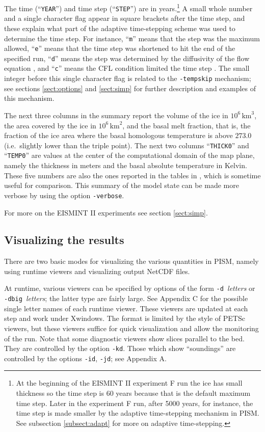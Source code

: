 \documentclass[11pt,final]{amsart}
\renewcommand{\t}[1]{\texttt{#1}}
\begin{document}
The time (``\t{YEAR}'') and time step (``\t{STEP}'') are in years.\footnote{At the beginning of the EISMINT II experiment F run the ice has small thickness so the time step is 60 years because that is the default maximum time step.  Later in the experiment F run, after 5000 years, for instance, the time step is made smaller by the adaptive time-stepping mechanism in PISM.  See subsection \ref{subsect:adapt} for more on adaptive time-stepping.}  A small whole number and a single character flag appear in square brackets after the time step, and these explain what part of the adaptive time-stepping scheme was used to determine the time step.  For instance, ``\t{m}'' means that the step was the maximum allowed, ``\t{e}'' means that the time step was shortened to hit the end of the specified run, ``\t{d}'' means the step was determined by the diffusivity of the flow equation \cite{BBL}, and ``\t{c}'' means the CFL condition limited the time step \cite{BBL,MortonMayers}.  The small integer before this single character flag is related to the \verb|-tempskip| mechanism; see sections \ref{sect:options} and \ref{sect:simp} for further description and examples of this mechanism.

The next three columns in the summary report the volume of the ice in $10^6 \,\text{km}^3$, the area covered by the ice in $10^6\,\text{km}^2$, and the basal melt fraction, that is, the fraction of the ice area where the basal homologous temperature is above $273.0$ (i.e.~slightly lower than the triple point).  The next two columns ``\texttt{THICK0}'' and ``\texttt{TEMP0}'' are values at the center of the computational domain of the map plane, namely the thickness in meters and the basal absolute temperature in Kelvin.  These five numbers are also the ones reported in the tables in \cite{EISMINT00}, which is sometime useful for comparison.  This summary of the model state can be made more verbose by using the option \verb|-verbose|.

For more on the EISMINT II experiments see section \ref{sect:simp}.

\subsection{Visualizing the results}  There are two basic modes for visualizing the various quantities in PISM, namely using runtime viewers and visualizing output NetCDF files.

At runtime, various viewers can be specified by options of the form \verb|-d |\emph{letters} or \verb|-dbig |\emph{letters}; the latter type are fairly large.  See Appendix C for the possible single letter names of each runtime viewer.  These viewers are updated at each step and work under Xwindows.  The format is limited by the style of PETSc viewers, but these viewers suffice for quick visualization and allow the monitoring of the run.  Note that some diagnostic viewers show slices parallel to the bed.  They are controlled by the option \verb|-kd|.  Those which show ``soundings'' are controlled by the options \verb|-id|, \verb|-jd|; see Appendix A.
\end{document}
